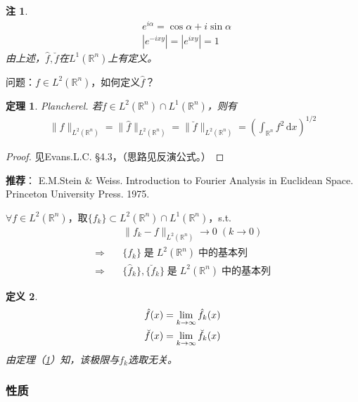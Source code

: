 \documentclass[11pt, a4paper]{article}
\theoremstyle{theorem}
\newtheorem{thm}{定理}[section]
\newtheorem{definition}[thm]{定义}
\newtheorem*{note}{注}
\newcommand{\intd}[1]{\,\mathrm{d}{#1}}
\begin{document}
\begin{note}
\begin{align*}
&e^{i\alpha} = \cos \alpha + i \sin \alpha \\
&|e^{-ixy}| = |e^{ixy}| = 1
\end{align*}
由上述，$\hat{f}, \breve{f}$在$L^1(\mathbb{R}^n)$上有定义。
\end{note}

问题：$f \in L^2(\mathbb{R}^n)$，如何定义$\hat{f}$？

\begin{thm} Plancherel.
\label{thm-Plancherel}
若$f \in L^2(\mathbb{R}^n) \cap L^1(\mathbb{R}^n)$，则有
\begin{align}
    \| f\|_{L^2(\mathbb{R}^n)} = \| \hat{f}\|_{L^2(\mathbb{R}^n)} = \| \breve{f}\|_{L^2(\mathbb{R}^n)} = \left(\int_{\mathbb{R}^n} f^2 \intd x \right)^{1/2}
\end{align}
\end{thm}
\begin{proof}
见Evans.L.C. \S 4.3，（思路见反演公式。）
\end{proof}

\textbf{推荐}： E.M.Stein \& Weiss. Introduction to Fourier Analysis in Euclidean Space. Princeton University Press. 1975.

$\forall f \in L^2(\mathbb{R}^n)$，取$\{f_k\} \subset L^2(\mathbb{R}^n) \cap L^1(\mathbb{R}^n)$，s.t.
\begin{align*}
    &\| f_k - f \|_{L^2(\mathbb{R}^n)} \longrightarrow 0 \; (k \rightarrow 0) \\
\Longrightarrow \quad &\{f_k\} \; \text{是} \; L^2(\mathbb{R}^n) \; \text{中的基本列} \\
\Longrightarrow \quad &\{\hat{f}_k\}, \{\breve{f}_k\} \; \text{是} \; L^2(\mathbb{R}^n) \; \text{中的基本列}
\end{align*}

\begin{definition}
\begin{align}
    \hat{f}(x) = \lim\limits_{k \rightarrow \infty} \hat{f}_k(x) \notag \\
    \breve{f}(x) = \lim\limits_{k \rightarrow \infty} \breve{f}_k(x)
\end{align}
由定理（\ref{thm-Plancherel}）知，该极限与$f_k$选取无关。
\end{definition}

\subsubsection{性质}
\end{document}
